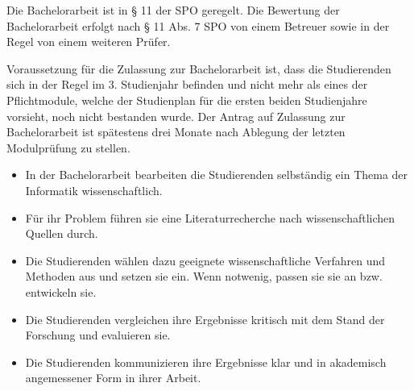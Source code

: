 \begin{module}

\setdoclanguagegerman
{}
\modulesubject{}





\modulehead


\label{mod_2361.dp_997}



\begin{styleenv}
\begin{assessment}
Die Bachelorarbeit ist in § 11 der SPO geregelt. Die Bewertung der Bachelorarbeit erfolgt nach § 11 Abs. 7 SPO von einem Betreuer sowie in der Regel von einem weiteren Prüfer.


\end{assessment}

\begin{conditions}Voraussetzung für die Zulassung zur Bachelorarbeit ist, dass die Studierenden sich in der Regel im 3. Studienjahr befinden und nicht mehr als eines der Pflichtmodule, welche der Studienplan für die ersten beiden Studienjahre vorsieht, noch nicht bestanden wurde. Der Antrag auf Zulassung zur Bachelorarbeit ist spätestens drei Monate nach Ablegung der letzten Modulprüfung zu stellen.

\end{conditions}


\end{styleenv}

\begin{learningoutcomes}
\begin{itemize}\item In der Bachelorarbeit bearbeiten die Studierenden selbständig ein Thema der Informatik wissenschaftlich.  \item Für ihr Problem führen sie eine Literaturrecherche nach wissenschaftlichen Quellen durch.  \item Die Studierenden wählen dazu geeignete wissenschaftliche Verfahren und Methoden aus und setzen sie ein. Wenn notwenig, passen sie sie an bzw. entwickeln sie.  \item Die Studierenden vergleichen ihre Ergebnisse kritisch mit dem Stand der Forschung und evaluieren sie.  \item Die Studierenden kommunizieren ihre Ergebnisse klar und in akademisch angemessener Form in ihrer Arbeit.  \end{itemize}
\end{learningoutcomes}


\end{module}
